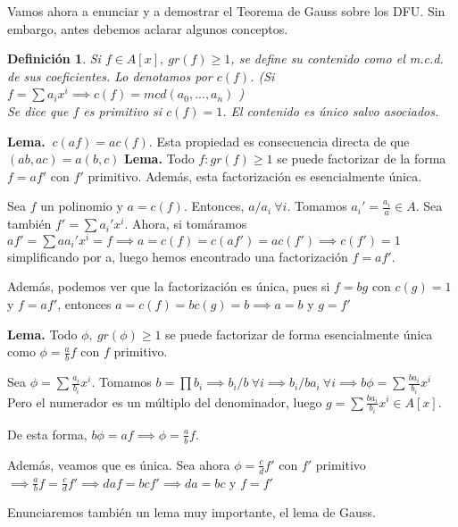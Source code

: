 \documentclass[11pt, a4paper, titlepage]{article}
\makeatletter
\newif\IfInSansMode
\let\oldsf\sffamily
\renewcommand*{\sffamily}{\oldsf\mathversion{sans}\InSansModetrue}
\let\oldnorm\normalfont
\renewcommand*{\normalfont}{\oldnorm\InSansModefalse\mathversion{normal}}
\renewenvironment{proof}[1][\proofname] {\vspace{-15pt}\par\pushQED{\qed}\normalfont\topsep6\p@\@plus6\p@\relax\trivlist\item[\hskip\labelsep\it#1\@addpunct{.}]\ignorespaces}{\popQED\endtrivlist\@endpefalse}
\renewenvironment{proof}[1][\proofname] {\par\pushQED{\qed}\normalfont\topsep6\p@\@plus6\p@\relax\trivlist\item[\hskip\labelsep\itshape\sffamily#1\@addpunct{.}]\ignorespaces}{\popQED\endtrivlist\@endpefalse}
\theoremstyle{theorem-style}
\theoremstyle{definition-style}
\newtheorem{ndef}{Definición}[section]
\theoremstyle{remark-style}
\theoremstyle{example-style}
\makeatother
\begin{document}
Vamos ahora a enunciar y a demostrar el Teorema de Gauss sobre los DFU. Sin embargo, antes debemos aclarar algunos conceptos.
\begin{ndef}
Si $f \in A[x],\ gr(f) \geq 1$, se define su contenido como el m.c.d. de sus coeficientes. Lo denotamos por $c(f)$. (Si $f= \sum a_i x^i \implies c(f) = mcd(a_0,...,a_n)$	)\\
Se dice que $f$ es primitivo si $c(f) = 1$. El contenido es único salvo asociados.
\end{ndef}
\textbf{Lema.} $ \ c(af) = ac(f)$. Esta propiedad es consecuencia directa de que $(ab,ac) = a(b,c)$
\textbf{Lema.} Todo $f: gr(f) \geq 1$ se puede factorizar de la forma $f = af'$ con $f'$ primitivo. Además, esta factorización es esencialmente única.
\begin{proof}
	Sea $f$ un polinomio y $a = c(f)$. Entonces, $a/a_i \ \forall i$. Tomamos $a_i' = \frac{a_i}{a} \in A$. Sea también $f' = \sum a_i'x^i$. Ahora, si tomáramos $af'= \sum aa_i' x^i = f \implies a = c(f) = c(af') = ac(f') \implies c(f') = 1$ simplificando por a, luego hemos encontrado una factorización $f=af'$.

	Además, podemos ver que la factorización es única, pues si $f=bg$ con $c(g)=1$ y $f=af'$, entonces $a = c(f) = b c(g) = b \implies a=b$ y $g=f'$
\end{proof}

\textbf{Lema.} Todo $\phi,\ gr(\phi) \geq 1$ se puede factorizar de forma esencialmente única como $\phi = \frac{a}{b} f$ con $f$ primitivo.
\begin{proof}
	Sea $\phi = \sum \frac{a_i}{b_i} x^i$. Tomamos $b= \prod b_i \implies b_i/b \ \forall i \implies b_i /ba_i \ \forall i \implies b \phi = \sum \frac{ba_i}{b_i}x^i$ Pero el numerador es un múltiplo del denominador, luego $g = \sum \frac{ba_i}{b_i}x^i \in A[x]$.

	De esta forma, $b\phi = af \implies \phi = \frac{a}{b} f$.

	Además, veamos que es única. Sea ahora $\phi = \frac{c}{d} f'$ con $f'$ primitivo$\implies \frac{a}{b} f = \frac{c}{d} f' \implies daf=bcf' \implies da = bc$ y $f=f'$
\end{proof}

Enunciaremos también un lema muy importante, el lema de Gauss.\\
\end{document}
